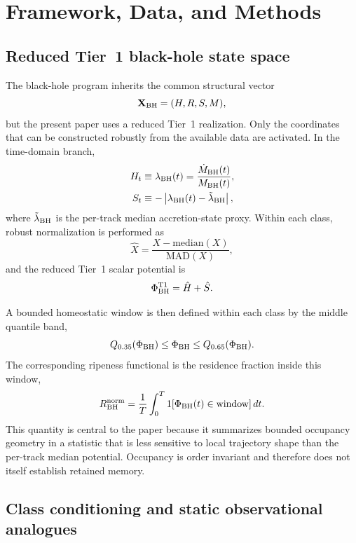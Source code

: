 \documentclass[11pt]{article}
\begin{document}
\section{Framework, Data, and Methods}

\subsection{Reduced Tier~1 black-hole state space}

The black-hole program inherits the common structural vector
\begin{equation}
\mathbf{X}_{\rm BH}=(H,R,S,M),
\end{equation}
but the present paper uses a reduced Tier~1 realization. Only the coordinates that can be constructed robustly from the available data are activated. In the time-domain branch,
\begin{align}
H_t &\equiv \lambda_{\rm BH}(t)=\frac{\dot M_{\rm BH}(t)}{M_{\rm BH}(t)},\\
S_t &\equiv -\left|\lambda_{\rm BH}(t)-\tilde\lambda_{\rm BH}\right|,
\end{align}
where $\tilde\lambda_{\rm BH}$ is the per-track median accretion-state proxy. Within each class, robust normalization is performed as
\begin{equation}
\hat X = \frac{X-\mathrm{median}(X)}{\mathrm{MAD}(X)},
\end{equation}
and the reduced Tier~1 scalar potential is
\begin{equation}
\Phi_{\rm BH}^{\rm T1}=\hat H+\hat S.
\end{equation}

A bounded homeostatic window is then defined within each class by the middle quantile band,
\begin{equation}
Q_{0.35}(\Phi_{\rm BH}) \le \Phi_{\rm BH} \le Q_{0.65}(\Phi_{\rm BH}).
\end{equation}
The corresponding ripeness functional is the residence fraction inside this window,
\begin{equation}
R_{\rm BH}^{\rm norm}=\frac{1}{T}\int_{0}^{T} 1[\Phi_{\rm BH}(t)\in \mathrm{window}]\,dt.
\end{equation}
This quantity is central to the paper because it summarizes bounded occupancy geometry in a statistic that is less sensitive to local trajectory shape than the per-track median potential. Occupancy is order invariant and therefore does not itself establish retained memory.

\subsection{Class conditioning and static observational analogues}
\end{document}
